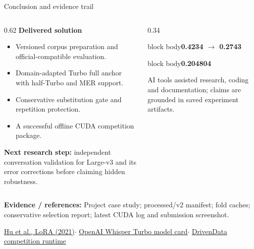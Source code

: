 \documentclass[aspectratio=169,11pt]{beamer}
\newcommand{\metric}[2]{\begin{beamercolorbox}[sep=3mm,center,wd=\linewidth]{block body}{\LARGE\bfseries\color{teal}#1}\par\vspace{1mm}{\small #2}\end{beamercolorbox}}
\begin{document}
\begin{frame}{Conclusion and evidence trail}
\begin{columns}[T]
\begin{column}{0.62\textwidth}
\textbf{Delivered solution}
\begin{itemize}\item Versioned corpus preparation and official-compatible evaluation.
\item Domain-adapted Turbo full anchor with half-Turbo and MER support.
\item Conservative substitution gate and repetition protection.
\item A successful offline CUDA competition package.
\end{itemize}
\vspace{2mm}
\textbf{Next research step:} independent conversation validation for Large-v3 and its error corrections before claiming hidden robustness.
\end{column}
\begin{column}{0.34\textwidth}
\metric{0.4234 $\to$ 0.2743}{Same displayed score column}
\vspace{3mm}\metric{0.204804}{Submitted system local OOF WER}
\vspace{3mm}\small\color{slate}AI tools assisted research, coding and documentation; claims are grounded in saved experiment artifacts.
\end{column}
\end{columns}
\vfill
{\scriptsize\color{slate}\textbf{Evidence / references:} Project case study; processed/v2 manifest; fold caches; conservative selection report; latest CUDA log and submission screenshot.\par
\href{https://arxiv.org/abs/2106.09685}{Hu et al., LoRA (2021)}\quad$\cdot$\quad
\href{https://huggingface.co/openai/whisper-large-v3-turbo}{OpenAI Whisper Turbo model card}\quad$\cdot$\quad
\href{https://github.com/drivendataorg/lost-in-transcription-runtime}{DrivenData competition runtime}}
\end{frame}
\end{document}
